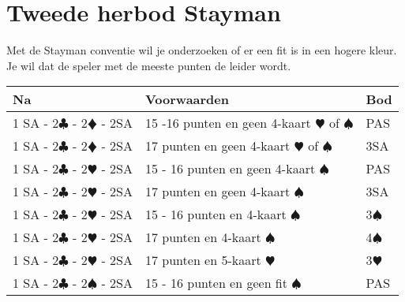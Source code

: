 \documentclass[12pt,a4paper]{report}
\begin{document}
\newpage

\section{Tweede herbod Stayman}
Met de Stayman conventie wil je onderzoeken of er een fit is
in een hogere kleur. 
Je wil dat de speler met de meeste punten de leider wordt. 
\\ 

\begin{tabular}{|l|p{4cm}|l|}
	\hline 
	\textbf{Na} &\textbf{Voorwaarden}  &\textbf{Bod}  \\  
	\hline
	
	1 SA - 2$\clubsuit$ - 2$\vardiamondsuit$ - 2SA 
	& 15 -16 punten\newline
	en geen 4-kaart $\varheartsuit$ of $\spadesuit$
	& PAS \\
	\hline 
	
	1 SA	- 2$\clubsuit$ - 2$\vardiamondsuit$ - 2SA	
	& 17 punten\newline
	en geen 4-kaart $\varheartsuit$ of $\spadesuit$ 
	& 3SA \\
	\hline \hline
	
	1 SA	- 2$\clubsuit$ - 2$\varheartsuit$ - 2SA	 
	& 15 - 16 punten\newline
	en geen 4-kaart $\spadesuit$ 
	& PAS \\
	\hline 
	
	1 SA	- 2$\clubsuit$ - 2$\varheartsuit$ - 2SA	 
	& 17 punten\newline 
	en geen 4-kaart $\spadesuit$ 
	& 3SA \\
	\hline 
	
	1 SA	- 2$\clubsuit$ - 2$\varheartsuit$ - 2SA	 
	& 15 - 16 punten\newline 
	en 4-kaart $\spadesuit$ 
	& 3$\spadesuit$ \\
	\hline 
	
	1 SA	- 2$\clubsuit$ - 2$\varheartsuit$ - 2SA	 
	& 17 punten\newline 
	en 4-kaart $\spadesuit$ 
	& 4$\spadesuit$ \\
	\hline 
	
	1 SA	- 2$\clubsuit$ - 2$\varheartsuit$ - 2SA	 
	& 17 punten\newline 
	en 5-kaart $\varheartsuit$ 
	& 3$\varheartsuit$ \\
	\hline \hline
	
	1 SA	- 2$\clubsuit$ - 2$\spadesuit$  - 2SA	 
	& 15 - 16 punten\newline 
	en geen fit $\spadesuit$ 
	& PAS \\
	\hline 
	

\end{tabular}
\end{document}
